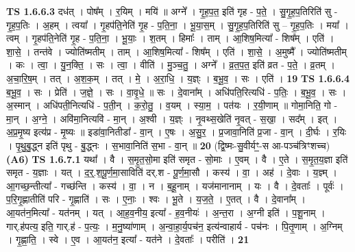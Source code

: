 \documentclass[17pt]{extarticle}
\begin{document}
                  \newline
                                \textbf{ TS 1.6.6.3} \newline
                  दध॑त् । पोष᳚म् । र॒यिम् । मयि॑ ॥ अग्ने᳚ । गृ॒ह॒प॒त॒ इति॑ गृह - प॒ते॒ । सु॒गृ॒ह॒प॒तिरिति॑ सु - गृ॒ह॒प॒तिः । अ॒हम् । त्वया᳚ । गृ॒हप॑ति॒नेति॑ गृ॒ह - प॒ति॒ना॒ । भू॒या॒स॒म् । सु॒गृ॒ह॒प॒तिरिति॑ सु – गृ॒ह॒प॒तिः  । मया᳚ । त्वम् । गृ॒हप॑ति॒नेति॑ गृ॒ह - प॒ति॒ना॒ । भू॒याः॒ । श॒तम् । हिमाः᳚ । ताम् । आ॒शिष॒मित्या᳚ - शिष᳚म् । एति॑ । शा॒से॒ । तन्त॑वे । ज्योति॑ष्मतीम् । ताम् । आ॒शिष॒मित्या᳚ - शिष᳚म् । एति॑ । शा॒से॒ । अ॒मुष्मै᳚ । ज्योति॑ष्मतीम् । कः । त्वा॒ । यु॒न॒क्ति॒ । सः । त्वा॒ । वीति॑ । मु॒ञ्च॒तु॒ । अग्ने᳚ । व्र॒त॒प॒त॒ इति॑ व्रत - प॒ते॒ । व्र॒तम् । अ॒चा॒रि॒ष॒म् । तत् । अ॒श॒क॒म् । तत् । मे॒ । अ॒रा॒धि॒ । य॒ज्ञ्ः । ब॒भू॒व॒ । सः । एति॑ । \textbf{  19} \newline
                  \newline
                                \textbf{ TS 1.6.6.4} \newline
                  ब॒भू॒व॒ । सः । प्रेति॑ । ज॒ज्ञे॒ । सः । वा॒वृ॒धे॒ ॥ सः । दे॒वाना᳚म् । अधि॑पति॒रित्यधि॑ - प॒तिः॒ । ब॒भू॒व॒ । सः । अ॒स्मान् । अधि॑पती॒नित्यधि॑ - प॒ती॒न् । क॒रो॒तु॒ । व॒यम् । स्या॒म॒ । पत॑यः । र॒यी॒णाम् ॥ गोमा॒निति॒ गो - मा॒न् । अ॒ग्ने॒ । अवि॑मा॒नित्यवि॑ - मा॒न् । अ॒श्वी । य॒ज्ञ्ः । नृ॒वथ्स॒खेति॑ नृ॒वत् - स॒खा॒ । सद᳚म् । इत् । अ॒प्र॒मृ॒ष्य इत्य॑प्र - मृ॒ष्यः ॥ इडा॑वा॒नितीडा᳚ - वा॒न् । ए॒षः । अ॒सु॒र॒ । प्र॒जावा॒निति॑ प्र॒जा - वा॒न् । दी॒र्घः । र॒यिः । पृ॒थु॒बु॒द्ध्न इति॑ पृथु - बु॒द्ध्नः । स॒भावा॒निति॑ स॒भा - वा॒न् ॥ \textbf{  20} \newline
                  \newline
                      (द्वि॒ष्मः-सु॒वीर्यꣳ॒॒-स आ-पञ्च॑त्रिꣳशच्च)  \textbf{(A6)} \newline \newline
                                \textbf{ TS 1.6.7.1} \newline
                  यथा᳚ । वै । स॒मृ॒त॒सो॒मा इति॑ समृत - सो॒माः । ए॒वम् । वै । ए॒ते । स॒मृ॒त॒य॒ज्ञा इति॑ समृत - य॒ज्ञाः । यत् । द॒र्॒.श॒पू॒र्ण॒मा॒साविति॑ दर्.श - पू॒र्ण॒मा॒सौ । कस्य॑ । वा॒ । अह॑ । दे॒वाः । य॒ज्ञ्म् । आ॒गच्छ॒न्तीत्या᳚ - गच्छ॑न्ति । कस्य॑ । वा॒ । न । ब॒हू॒नाम् । यज॑मानानाम् । यः । वै । दे॒वताः᳚ । पूर्वः॑ । प॒रि॒गृ॒ह्णातीति॑ परि - गृ॒ह्णाति॑ । सः । ए॒नाः॒ । श्वः । भू॒ते । य॒ज॒ते॒ । ए॒तत् । वै । दे॒वाना᳚म् । आ॒यत॑न॒मित्या᳚ - यत॑नम् । यत् । आ॒ह॒व॒नीय॒ इत्या᳚ - ह॒व॒नीयः॑ । अ॒न्त॒रा । अ॒ग्नी इति॑ । प॒शू॒नाम् । गार्.ह॑पत्य॒ इति॒ गार्.ह॑ - प॒त्यः॒ । म॒नु॒ष्या॑णाम् । अ॒न्वा॒हा॒र्य॒पच॑न॒ इत्य॑न्वाहार्य - पच॑नः । पि॒तृ॒णाम् । अ॒ग्निम् । गृ॒ह्णा॒ति॒ । स्वे । ए॒व । आ॒यत॑न॒ इत्या᳚ - यत॑ने । दे॒वताः᳚ । परीति॑ । \textbf{  21} \newline
\end{document}
